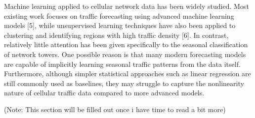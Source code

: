 Machine learning applied to cellular network data has been widely studied. Most existing work focuses on traffic forecasting using advanced machine learning models [5], while unsupervised learning techniques have also been applied to clustering and identifying regions with high traffic density [6]. In contrast, relatively little attention has been given specifically to the seasonal classification of network towers. One possible reason is that many modern forecasting models are capable of implicitly learning seasonal traffic patterns from the data itself. Furthermore, although simpler statistical approaches such as linear regression are still commonly used as baselines, they may struggle to capture the nonlinearity nature of cellular traffic data compared to more advanced models.

(Note: This section will be filled out once i have time to read a bit more)